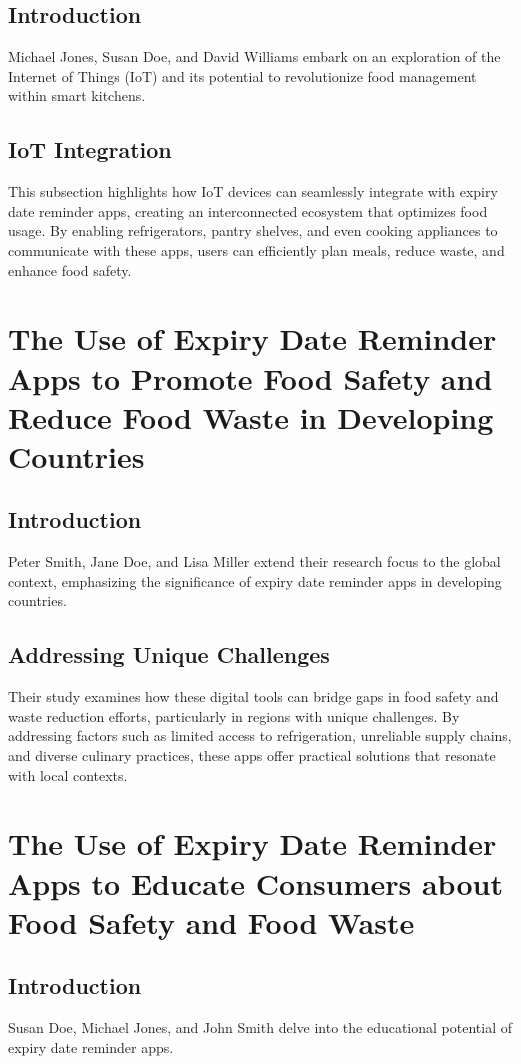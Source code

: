 \subsection{Introduction}
Michael Jones, Susan Doe, and David Williams embark on an exploration of the Internet of Things (IoT) and its potential to revolutionize food management within smart kitchens.

\subsection{IoT Integration}
This subsection highlights how IoT devices can seamlessly integrate with expiry date reminder apps, creating an interconnected ecosystem that optimizes food usage. By enabling refrigerators, pantry shelves, and even cooking appliances to communicate with these apps, users can efficiently plan meals, reduce waste, and enhance food safety.

\section{The Use of Expiry Date Reminder Apps to Promote Food Safety and Reduce Food Waste in Developing Countries}

\subsection{Introduction}
Peter Smith, Jane Doe, and Lisa Miller extend their research focus to the global context, emphasizing the significance of expiry date reminder apps in developing countries.

\subsection{Addressing Unique Challenges}
Their study examines how these digital tools can bridge gaps in food safety and waste reduction efforts, particularly in regions with unique challenges. By addressing factors such as limited access to refrigeration, unreliable supply chains, and diverse culinary practices, these apps offer practical solutions that resonate with local contexts.

\section{The Use of Expiry Date Reminder Apps to Educate Consumers about Food Safety and Food Waste}

\subsection{Introduction}
Susan Doe, Michael Jones, and John Smith delve into the educational potential of expiry date reminder apps.

